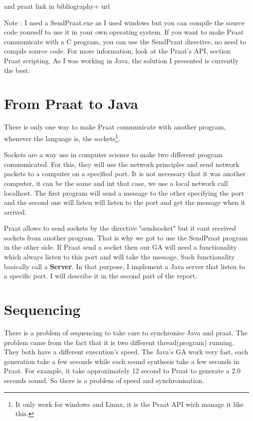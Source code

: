 \documentclass[12pt]{report}
\begin{document}
 and praat link in bibliography+ url

Note : I used a SendPraat.exe as I used windows but you can compile the source code yourself to use it in your own operating system. If you want to make Praat communicate with a C program, you can use the SendPraat directive, no need to compile source code. For more information, look at the Praat's API, section Praat scripting. As I was working in Java, the solution I presented is currently the best.

\section{From Praat to Java}
There is only one way to make Praat communicate with another program, whenever the language is, the sockets\footnote{It only work for windows and Linux, it is the Praat API wich manage it like this.}. 

Sockets are a way use in computer science to make two different program communicated. For this, they will use the network principles and send network packets to a computer on a specified port. It is not necessary that it was another computer, it can be the same and int that case, we use a local network call localhost. The first program will send a message to the other specifying the port and the second one will listen will listen to the port and get the message when it arrived.

Praat allows to send sockets by the directive "sendsocket" but it cant received sockets from another program. That is why we got to use the SendPraat program in the other side.
If Praat send a socket then our GA will need a functionality which always listen to this port and  will take the message. Such functionality basically call a {\bfseries Server}.
In that purpose, I implement a Java server that listen to a specific port. I will describe it in the second part of the report.

\section{Sequencing}
There is a problem of sequencing to take care to synchronise Java and praat. The problem came from the fact that it is two different thread(program) running.
They both have a different execution's speed. The Java's GA work very fast, each generation take a few seconds while each sound synthesis take a few seconds in Praat. For example, it take approximately 12 second to Praat to generate a 2.0 seconds sound.
So there is a problem of speed and synchronisation.
\end{document}
